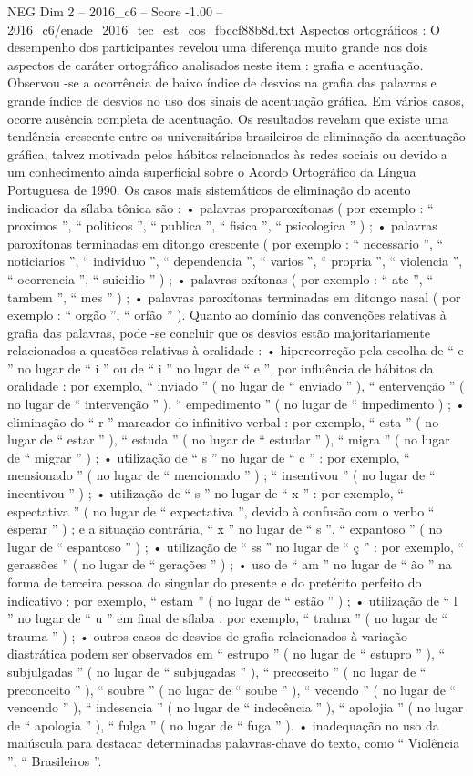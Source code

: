 \begin{textsample}{NEG Dim 2 – 2016\_c6 – Score -1.00 – 2016\_c6/enade\_2016\_tec\_est\_cos\_fbccf88b8d.txt}
Aspectos ortográficos : O desempenho dos participantes revelou uma diferença muito grande nos dois aspectos de caráter ortográfico analisados neste item : grafia e acentuação.
Observou -se a ocorrência de baixo índice de desvios na grafia das palavras e grande índice de desvios no uso dos sinais de acentuação gráfica.
Em vários casos, ocorre ausência completa de acentuação.
Os resultados revelam que existe uma tendência crescente entre os universitários brasileiros de eliminação da acentuação gráfica, talvez motivada pelos hábitos relacionados às redes sociais ou devido a um conhecimento ainda superficial sobre o Acordo Ortográfico da Língua Portuguesa de 1990.
Os casos mais sistemáticos de eliminação do acento indicador da sílaba tônica são : • palavras proparoxítonas ( por exemplo : “ proximos ”, “ politicos ”, “ publica ”, “ fisica ”, “ psicologica ” ) ; • palavras paroxítonas terminadas em ditongo crescente ( por exemplo : “ necessario ”, “ noticiarios ”, “ individuo ”, “ dependencia ”, “ varios ”, “ propria ”, “ violencia ”, “ ocorrencia ”, “ suicidio ” ) ; • palavras oxítonas ( por exemplo : “ ate ”, “ tambem ”, “ mes ” ) ; • palavras paroxítonas terminadas em ditongo nasal ( por exemplo : “ orgão ”, “ orfão ” ).
Quanto ao domínio das convenções relativas à grafia das palavras, pode -se concluir que os desvios estão majoritariamente relacionados a questões relativas à oralidade : • hipercorreção pela escolha de “ e ” no lugar de “ i ” ou de “ i ” no lugar de “ e ”, por influência de hábitos da oralidade : por exemplo, “ inviado ” ( no lugar de “ enviado ” ), “ entervenção ” ( no lugar de “ intervenção ” ), “ empedimento ” ( no lugar de “ impedimento ) ; • eliminação do “ r ” marcador do infinitivo verbal : por exemplo, “ esta ” ( no lugar de “ estar ” ), “ estuda ” ( no lugar de “ estudar ” ), “ migra ” ( no lugar de “ migrar ” ) ; • utilização de “ s ” no lugar de “ c ” : por exemplo, “ mensionado ” ( no lugar de “ mencionado ” ) ; “ insentivou ” ( no lugar de “ incentivou ” ) ; • utilização de “ s ” no lugar de “ x ” : por exemplo, “ espectativa ” ( no lugar de “ expectativa ”, devido à confusão com o verbo “ esperar ” ) ; e a situação contrária, “ x ” no lugar de “ s ”, “ expantoso ” ( no lugar de “ espantoso ” ) ; • utilização de “ ss ” no lugar de “ ç ” : por exemplo, “ gerassões ” ( no lugar de “ gerações ” ) ; • uso de “ am ” no lugar de “ ão ” na forma de terceira pessoa do singular do presente e do pretérito perfeito do indicativo : por exemplo, “ estam ” ( no lugar de “ estão ” ) ; • utilização de “ l ” no lugar de “ u ” em final de sílaba : por exemplo, “ tralma ” ( no lugar de “ trauma ” ) ; • outros casos de desvios de grafia relacionados à variação diastrática podem ser observados em “ estrupo ” ( no lugar de “ estupro ” ), “ subjulgadas ” ( no lugar de “ subjugadas ” ), “ precoseito ” ( no lugar de “ preconceito ” ), “ soubre ” ( no lugar de “ soube ” ), “ vecendo ” ( no lugar de “ vencendo ” ), “ indesencia ” ( no lugar de “ indecência ” ), “ apolojia ” ( no lugar de “ apologia ” ), “ fulga ” ( no lugar de “ fuga ” ). • inadequação no uso da maiúscula para destacar determinadas palavras-chave do texto, como “ Violência ”, “ Brasileiros ”.

\end{textsample}
